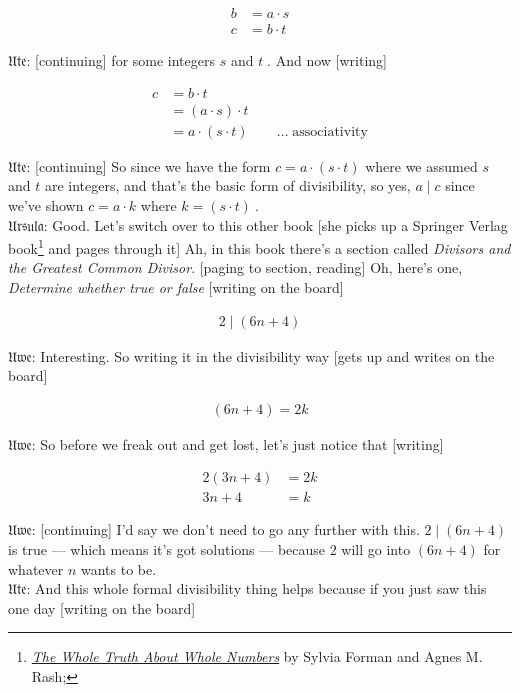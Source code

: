 \documentclass[american]{article}
\begin{document}
\begin{align*}
b &= a \cdot s \\[.4em]
c &= b \cdot t
\end{align*}

𝔘𝔱𝔢: [continuing] for
some integers \(s\) and \(t\;\). And now [writing]

\begin{align*}
c &= b \cdot t \\[.4em]
&= (a \cdot s) \cdot t   \\[.4em]
&= a \cdot (s \cdot t) \quad\quad \ldots \; \text{associativity}
\end{align*}

𝔘𝔱𝔢: [continuing] So
since we have the form \(c = a \cdot (s \cdot t)\) where we assumed \(s\) and \(t\)
are integers, and that's the basic form of divisibility, so yes, \(a
\mid c\) since we've shown \(c = a \cdot k\) where \(k = (s \cdot t)\:\). \\[0pt]
𝔘𝔯𝔰𝔲𝔩𝔞: Good. Let's
switch over to this other book [she picks up a Springer Verlag
book\footnote{\emph{\href{https://www.google.com/books/edition/The\_Whole\_Truth\_About\_Whole\_Numbers/ahUGswEACAAJ?hl=en}{The Whole Truth About Whole Numbers}} by Sylvia Forman and
Agnes M. Rash;} and pages through it] Ah, in this book there's a section
called \emph{Divisors and the Greatest Common Divisor}. [paging to section,
reading] Oh, here's one, \emph{Determine whether true or false} [writing on
the board]

\begin{align*}
2 \mid (6n + 4)
\end{align*}

𝔘𝔴𝔢: Interesting. So
writing it in the divisibility way [gets up and writes on the board]

\begin{align*}
(6n + 4) = 2k
\end{align*}

𝔘𝔴𝔢: So before we freak
out and get lost, let's just notice that [writing]

\begin{align}
2(3n + 4) &= 2k \\[.4em]
3n + 4 &= k
\end{align}

𝔘𝔴𝔢: [continuing] I'd
say we don't need to go any further with this. \(2 \mid (6n + 4)\) is
true --- which means it's got solutions --- because \(2\) will go into
\((6n + 4)\) for whatever \(n\) wants to be. \\[0pt]
𝔘𝔱𝔢: And this whole
formal divisibility thing helps because if you just saw this one day
[writing on the board]
\end{document}
